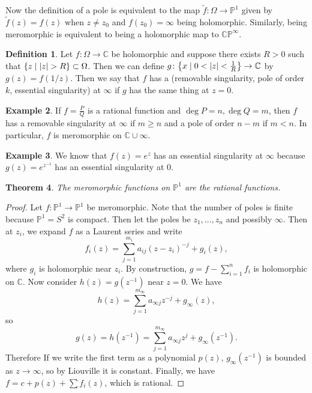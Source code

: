 \documentclass[leqno, openany]{memoir}
\newtheorem{thm}{Theorem}[section]
\theoremstyle{definition}
\newtheorem{defn}[thm]{Definition}
\newtheorem{exm}[thm]{Example}
\theoremstyle{remark}
\theoremstyle{plain}
\theoremstyle{definition}
\theoremstyle{remark}
\newcommand{\C}{\mathbb{C}}
\renewcommand{\P}{\mathbb{P}}
\newcommand{\wt}[1]{\widetilde{#1}}
\begin{document}
Now the definition of a pole is equivalent to the map $\wt{f} \colon \Omega \to
\P^1$ given by $\wt{f}(z) = f(z)$ when $z \neq z_0$ and $f(z_0) = \infty$ being
holomorphic. Similarly, being meromorphic is equivalent to being a holomorphic
map to $\C\P^{\infty}$. 

\begin{defn} Let $f \colon \Omega \to \C$ be holomorphic and suppose there
    exists $R > 0$ such that $\qty{z \mid \abs{z} > R} \subset \Omega$. Then we
    can define $g \colon \qty{x \mid 0 < \abs{z} < \frac{1}{R}} \to \C$ by
    $g(z) = f(1/z)$. Then we say that $f$ has a (removable singularity, pole of
    order $k$, essential singularity) at $\infty$ if $g$ has the same thing at
    $z = 0$.  \end{defn}

\begin{exm} If $f = \frac{P}{Q}$ is a rational function and $\deg P = n, \deg Q
    = m$, then $f$ has a removable singularity at $\infty$ if $m \geq n$ and a
    pole of order $n-m$ if $m < n$. In particular, $f$ is meromorphic on $\C
    \cup \infty$.  \end{exm}

\begin{exm} We know that $f(z) = e^{z}$ has an essential singularity at
$\infty$ because $g(z) = e^{z^{-1}}$ has an essential singularity at $0$.
\end{exm}

\begin{thm} The meromorphic functions on $\P^1$ are the rational functions.
\end{thm}

\begin{proof} Let $f \colon \P^1 \to \P^1$ be meromorphic. Note that the number
    of poles is finite because $\P^1 = S^2$ is compact. Then let the poles be
    $z_1, \ldots, z_n$ and possibly $\infty$. Then at $z_i$, we expand $f$ as a
    Laurent series and write \[ f_i(z) = \sum_{j=1}^{m_i} a_{ij} {(z-z_i)}^{-j}
    + g_i(z), \] where $g_i$ is holomorphic near $z_i$. By construction, $g = f
    - \sum_{i=1}^n f_i$ is holomorphic on $\C$. Now consider $h(z) = g(z^{-1})$
    near $z = 0$. We have \[ h(z) = \sum_{j=1}^{m_{\infty}} a_{\infty j} z^{-j}
        + g_{\infty}(z), \] so \[g(z) = h(z^{-1}) = \sum_{j=1}^{m_{\infty}}
    a_{\infty j} z^j + g_{\infty}(z^{-1}). \] Therefore If we write the first
    term as a polynomial $p(z)$, $g_{\infty}(z^{-1})$ is bounded as $z \to
    \infty$, so by Liouville it is constant. Finally, we have $f = c + p(z) +
    \sum f_i(z)$, which is rational.  \end{proof}
\end{document}
